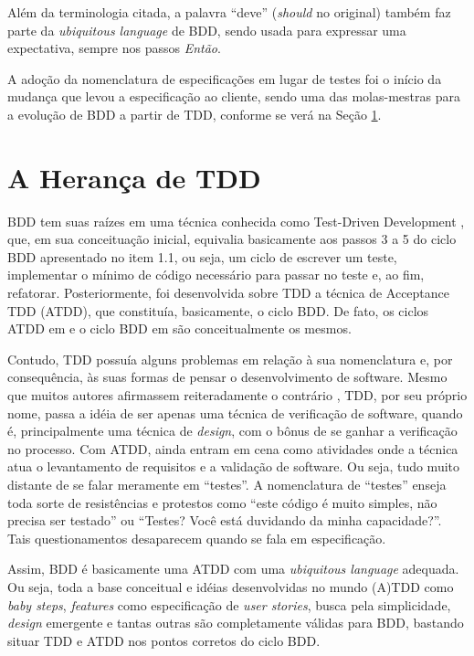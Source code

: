 \documentclass[a4paper,abntfigtabnum,noindentfirst]{abnt}
\begin{document}
Além da terminologia citada, a palavra ``deve'' (\textit{should} no original) também faz parte da \textit{ubiquitous language} de BDD, sendo usada para expressar uma expectativa, sempre nos passos \textit{Então}.

A adoção da nomenclatura de especificações em lugar de testes foi o início da mudança que levou a especificação ao cliente, sendo uma das molas-mestras para a evolução de BDD a partir de TDD, conforme se verá na Seção \ref{HerancaTDD}.

\section{A Herança de TDD}
\label{HerancaTDD}

BDD tem suas raízes em uma técnica conhecida como Test-Driven Development \cite{TDDByExample}, que, em sua conceituação inicial, equivalia basicamente aos passos 3 a 5 do ciclo BDD apresentado no item 1.1, ou seja, um ciclo de escrever um teste, implementar o mínimo de código necessário para passar no teste e, ao fim, refatorar. Posteriormente, foi desenvolvida sobre TDD a técnica de Acceptance TDD (ATDD), que constituía, basicamente, o ciclo BDD. De fato, os ciclos ATDD em  e o ciclo BDD em  são conceitualmente os mesmos.

Contudo, TDD possuía alguns problemas em relação à sua nomenclatura e, por consequência, às suas formas de pensar o desenvolvimento de software. Mesmo que muitos autores afirmassem reiteradamente o contrário \cite{DrivingSoftwareQualityCrispin} \cite{TDDAstels} \cite{TDDDesignJanzen}, TDD, por seu próprio nome, passa a idéia de ser apenas uma técnica de verificação de software, quando é, principalmente uma técnica de \textit{design}, com o bônus de se ganhar a verificação no processo. Com ATDD, ainda entram em cena como atividades onde a técnica atua o levantamento de requisitos e a validação de software. Ou seja, tudo muito distante de se falar meramente em ``testes''. A nomenclatura de ``testes'' enseja toda sorte de resistências e protestos como ``este código é muito simples, não precisa ser testado'' ou ``Testes? Você está duvidando da minha capacidade?''. Tais questionamentos desaparecem quando se fala em especificação.

Assim, BDD é basicamente uma ATDD com uma \textit{ubiquitous language} adequada. Ou seja, toda a base conceitual e idéias desenvolvidas no mundo (A)TDD como \textit{baby steps}, \textit{features} como especificação de \textit{user stories}, busca pela simplicidade, \textit{design} emergente e tantas outras são completamente válidas para BDD, bastando situar TDD e ATDD nos pontos corretos do ciclo BDD.
\end{document}
